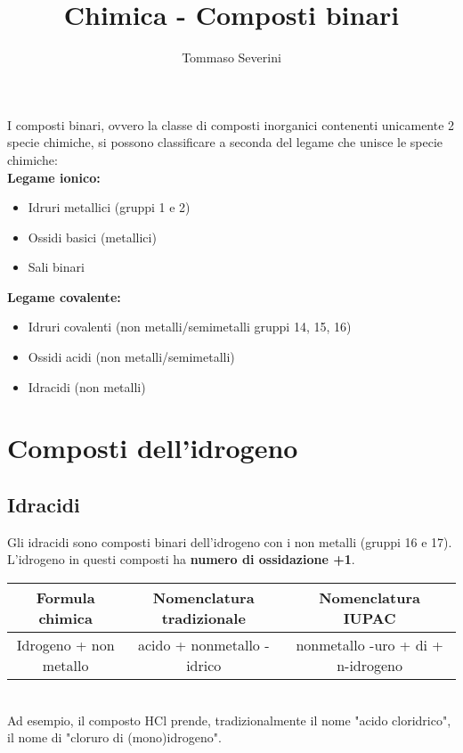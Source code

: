\documentclass[10pt,a4paper]{article}
\author{Tommaso Severini}
\title{Chimica - Composti binari}
\begin{document}
	\maketitle
	
	I composti binari, ovvero la classe di composti inorganici contenenti unicamente 2 specie chimiche, si possono classificare a seconda del legame che unisce le specie chimiche:\\
	
\textbf{	Legame ionico:}
	
	\begin{itemize}
		\item Idruri metallici (gruppi 1 e 2)
		\item Ossidi basici (metallici)
		\item Sali binari
	\end{itemize}

\textbf{	Legame covalente:}
	
	\begin{itemize}
		\item Idruri covalenti (non metalli/semimetalli gruppi 14, 15, 16)
		\item Ossidi acidi (non metalli/semimetalli)
		\item Idracidi (non metalli)
	\end{itemize}

\section*{Composti dell'idrogeno}

 \subsection*{Idracidi}
 
 	Gli idracidi sono composti binari dell'idrogeno con i non metalli (gruppi 16 e 17). L'idrogeno in questi composti ha \textbf{numero di ossidazione +1}.\\
 	
 	\begin{tabular}{|c|c|c|}
 		\hline
 		Formula chimica & Nomenclatura tradizionale & Nomenclatura IUPAC \\
 		\hline
 		Idrogeno + non metallo & acido + nonmetallo -idrico & nonmetallo -uro + di + n-idrogeno \\
 		\hline
 	\end{tabular} \\
 
 	Ad esempio, il composto HCl prende, tradizionalmente il nome "acido cloridrico", il nome di "cloruro di (mono)idrogeno".
 	
\end{document}
